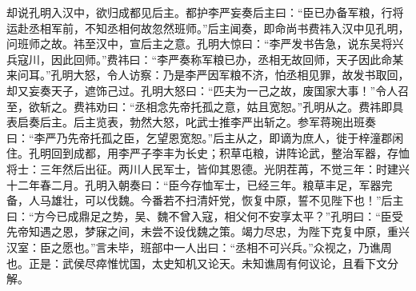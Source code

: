 却说孔明入汉中，欲归成都见后主。都护李严妄奏后主曰：“臣已办备军粮，行将运赴丞相军前，不知丞相何故忽然班师。”后主闻奏，即命尚书费祎入汉中见孔明，问班师之故。祎至汉中，宣后主之意。孔明大惊曰：“李严发书告急，说东吴将兴兵寇川，因此回师。”费祎曰：“李严奏称军粮已办，丞相无故回师，天子因此命某来问耳。”孔明大怒，令人访察：乃是李严因军粮不济，怕丞相见罪，故发书取回，却又妄奏天子，遮饰己过。孔明大怒曰：“匹夫为一己之故，废国家大事！”令人召至，欲斩之。费祎劝曰：“丞相念先帝托孤之意，姑且宽恕。”孔明从之。费祎即具表启奏后主。后主览表，勃然大怒，叱武士推李严出斩之。参军蒋琬出班奏曰：“李严乃先帝托孤之臣，乞望恩宽恕。”后主从之，即谪为庶人，徙于梓潼郡闲住。孔明回到成都，用李严子李丰为长史；积草屯粮，讲阵论武，整治军器，存恤将士：三年然后出征。两川人民军士，皆仰其恩德。光阴茬苒，不觉三年：时建兴十二年春二月。孔明入朝奏曰：“臣今存恤军士，已经三年。粮草丰足，军器完备，人马雄壮，可以伐魏。今番若不扫清奸党，恢复中原，誓不见陛下也！”后主曰：“方今已成鼎足之势，吴、魏不曾入寇，相父何不安享太平？”孔明曰：“臣受先帝知遇之恩，梦寐之间，未尝不设伐魏之策。竭力尽忠，为陛下克复中原，重兴汉室：臣之愿也。”言未毕，班部中一人出曰：“丞相不可兴兵。”众视之，乃谯周也。正是：武侯尽瘁惟忧国，太史知机又论天。未知谯周有何议论，且看下文分解。